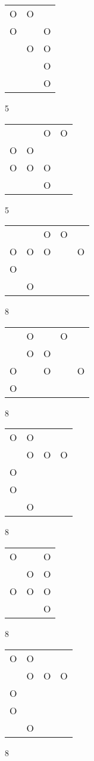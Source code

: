 \begin{tabular}{|m{0.2cm}m{0.2cm}m{0.2cm}|}\hline
O&O& \\
O& &O\\
 &O&O\\
 & &O\\
 & &O\\
\hline\end{tabular}5
\begin{tabular}{|m{0.2cm}m{0.2cm}m{0.2cm}m{0.2cm}|}\hline
 & &O&O\\
O&O& & \\
O&O&O& \\
 & &O& \\
\hline\end{tabular}5
\begin{tabular}{|m{0.2cm}m{0.2cm}m{0.2cm}m{0.2cm}m{0.2cm}|}\hline
 & &O&O& \\
O&O&O& &O\\
O& & & & \\
 &O& & & \\
\hline\end{tabular}8
\begin{tabular}{|m{0.2cm}m{0.2cm}m{0.2cm}m{0.2cm}m{0.2cm}|}\hline
 &O& &O& \\
 &O&O& & \\
O& &O& &O\\
O& & & & \\
\hline\end{tabular}8
\begin{tabular}{|m{0.2cm}m{0.2cm}m{0.2cm}m{0.2cm}|}\hline
O&O& & \\
 &O&O&O\\
O& & & \\
O& & & \\
 &O& & \\
\hline\end{tabular}8
\begin{tabular}{|m{0.2cm}m{0.2cm}m{0.2cm}|}\hline
O& &O\\
 &O&O\\
O&O&O\\
 & &O\\
\hline\end{tabular}8
\begin{tabular}{|m{0.2cm}m{0.2cm}m{0.2cm}m{0.2cm}|}\hline
O&O& & \\
 &O&O&O\\
O& & & \\
O& & & \\
 &O& & \\
\hline\end{tabular}8
